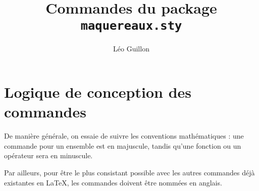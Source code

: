 \documentclass{article}
\title{Commandes du package \texttt{maquereaux.sty}}
\author{Léo Guillon}
\date{}
\begin{document}
\maketitle

\section{Logique de conception des commandes}

De manière générale, on essaie de suivre les conventions mathématiques : une commande pour un ensemble est en majuscule, tandis qu’une fonction ou un opérateur sera en minuscule.

Par ailleurs, pour être le plus consistant possible avec les autres commandes déjà existantes en LaTeX, les commandes doivent être nommées en anglais.
\end{document}
